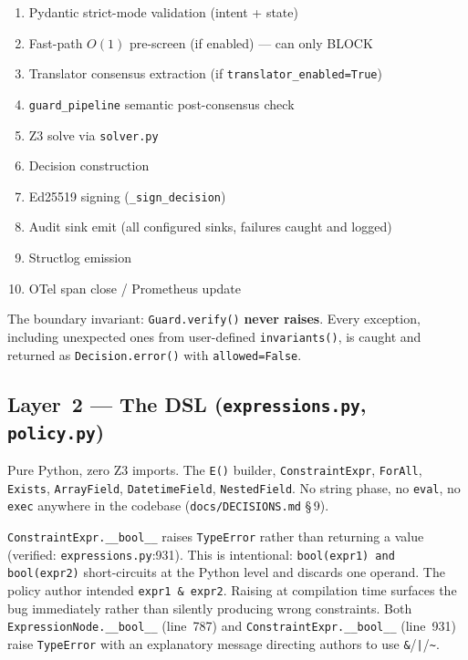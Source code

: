 \documentclass[12pt,a4paper,oneside]{report}
\newcommand{\fname}[1]{\texttt{#1}}          %
\newcommand{\code}[1]{\texttt{#1}}           %
\newcommand{\cfrsec}[1]{\S\,#1}             %
\begin{document}
\begin{enumerate}[label=\arabic*.]
  \item Pydantic strict-mode validation (intent + state)
  \item Fast-path $O(1)$ pre-screen (if enabled) --- can only BLOCK
  \item Translator consensus extraction (if \code{translator\_enabled=True})
  \item \code{guard\_pipeline} semantic post-consensus check
  \item Z3 solve via \fname{solver.py}
  \item Decision construction
  \item Ed25519 signing (\code{\_sign\_decision})
  \item Audit sink emit (all configured sinks, failures caught and logged)
  \item Structlog emission
  \item OTel span close / Prometheus update
\end{enumerate}

The boundary invariant: \code{Guard.verify()} \textbf{never raises}. Every
exception, including unexpected ones from user-defined \code{invariants()}, is
caught and returned as \code{Decision.error()} with \code{allowed=False}.

\subsection{Layer~2 --- The DSL (\fname{expressions.py}, \fname{policy.py})}

Pure Python, zero Z3 imports. The \code{E()} builder, \code{ConstraintExpr},
\code{ForAll}, \code{Exists}, \code{ArrayField}, \code{DatetimeField},
\code{NestedField}. No string phase, no \code{eval}, no \code{exec} anywhere
in the codebase (\fname{docs/DECISIONS.md} \cfrsec{9}).

\code{ConstraintExpr.\_\_bool\_\_} raises \code{TypeError} rather than
returning a value (verified: \fname{expressions.py}:931). This is intentional:
\code{bool(expr1) and bool(expr2)} short-circuits at the Python level and
discards one operand. The policy author intended \code{expr1 \& expr2}.
Raising at compilation time surfaces the bug immediately rather than silently
producing wrong constraints. Both \code{ExpressionNode.\_\_bool\_\_} (line~787)
and \code{ConstraintExpr.\_\_bool\_\_} (line~931) raise \code{TypeError} with
an explanatory message directing authors to use \code{\&}/\code{|}/\code{\~{}}.
\end{document}
